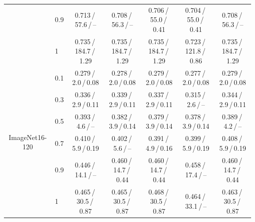 \documentclass[runningheads]{llncs}
\begin{document}
\begin{table}[!ht]
{\begin{tabular}{clccccc}
 & 0.9 & 0.713\,/\,57.6\,/\,-- & 0.708\,/\,56.3\,/\,-- & 0.706\,/\,55.0\,/\,0.41 & 0.704\,/\,55.0\,/\,0.41 & 0.708\,/\,56.3\,/\,-- \\
 & 1 & 0.735\,/\,184.7\,/\,1.29 & 0.735\,/\,184.7\,/\,1.29 & 0.735\,/\,184.7\,/\,1.29 & 0.723\,/\,121.8\,/\,0.86 & 0.735\,/\,184.7\,/\,1.29 \\
\midrule
\multirow{6}{*}{ImageNet16-120} & 0.1 & 0.279\,/\,2.0\,/\,0.08 & 0.278\,/\,2.0\,/\,0.08 & 0.279\,/\,2.0\,/\,0.08 & 0.277\,/\,2.0\,/\,0.08 & 0.279\,/\,2.0\,/\,0.08 \\
 & 0.3 & 0.336\,/\,2.9\,/\,0.11 & 0.339\,/\,2.9\,/\,0.11 & 0.337\,/\,2.9\,/\,0.11 & 0.315\,/\,2.6\,/\,-- & 0.344\,/\,2.9\,/\,0.11 \\
 & 0.5 & 0.393\,/\,4.6\,/\,-- & 0.382\,/\,3.9\,/\,0.14 & 0.379\,/\,3.9\,/\,0.14 & 0.378\,/\,3.9\,/\,0.14 & 0.389\,/\,4.2\,/\,-- \\
 & 0.7 & 0.410\,/\,5.9\,/\,0.19 & 0.402\,/\,5.6\,/\,-- & 0.391\,/\,4.9\,/\,0.16 & 0.399\,/\,5.9\,/\,0.19 & 0.408\,/\,5.9\,/\,0.19 \\
 & 0.9 & 0.446\,/\,14.1\,/\,-- & 0.460\,/\,14.7\,/\,0.44 & 0.460\,/\,14.7\,/\,0.44 & 0.458\,/\,17.4\,/\,-- & 0.460\,/\,14.7\,/\,0.44 \\
 & 1 & 0.465\,/\,30.5\,/\,0.87 & 0.465\,/\,30.5\,/\,0.87 & 0.468\,/\,30.5\,/\,0.87 & 0.464\,/\,33.1\,/\,-- & 0.463\,/\,30.5\,/\,0.87 \\
\bottomrule
\end{tabular}}
\end{table}
\end{document}
